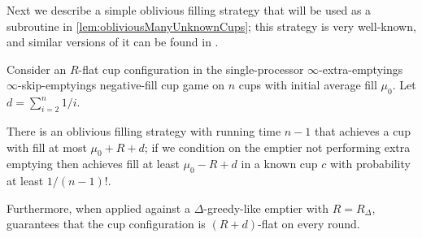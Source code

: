 Next we describe a simple oblivious filling strategy that will be used as a
subroutine in \cref{lem:obliviousManyUnknownCups}; this strategy is very
well-known, and similar versions of it can be found in
\cite{ mbe19, mbe15, die91, wku20}.
\begin{proposition}
  \label{prop:obliviousTerribleProbability}
  Consider an $R$-flat cup configuration in the single-processor
  $\infty$-extra-emptyings $\infty$-skip-emptyings negative-fill cup
  game on $n$ cups with initial average fill $\mu_0$.
  Let $d = \sum_{i=2}^n 1/i$.

  There is an oblivious filling strategy  with running
  time $n-1$ that achieves a cup with fill at most $\mu_0 + R +
  d$; if we condition on the emptier not performing extra
  emptying then \randalg achieves fill at least $\mu_0 -R + d$ in
  a known cup $c$ with probability at least $1/(n-1)!$.

  Furthermore, when applied against a $\Delta$-greedy-like emptier
  with $R = R_\Delta$, \randalg guarantees that
  the cup configuration is $(R + d)$-flat on every round.
\end{proposition}
